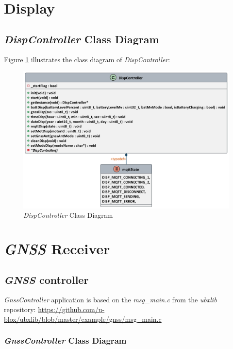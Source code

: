 \documentclass[report.tex]{subfiles}
\begin{document}
\section{Display}

\subsection{\textit{DispController} Class Diagram}

Figure \ref{fig:dispcontroller} illustrates the class diagram of \textit{DispController}: 

\begin{figure}[H]
	\centering
	\includegraphics[width=1\textwidth]{Include/Figure/software/class/dispcontroller.pdf}
	\caption{\textit{DispController} Class Diagram}
	\label{fig:dispcontroller}
\end{figure}

\pagebreak
\section{\textit{GNSS} Receiver}
\subsection{\textit{GNSS} controller}
\textit{GnssController} application is based on the \textit{msg\_main.c} from the \textit{ubxlib} repository: \url{https://github.com/u-blox/ubxlib/blob/master/example/gnss/msg_main.c}
\subsubsection{\textit{GnssController} Class Diagram}
\end{document}
